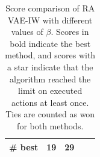 \begin{table}[ht]
\begin{center}
\begin{small}
\begin{tabular}{lrrrl}
\midrule

\# best &    19                   & 29                      \\

\bottomrule

\end{tabular}
\end{small}
\end{center}
\caption{Score comparison of RA VAE-IW with different values of $\beta$. Scores in bold indicate the best method, and scores with a star indicate that the algorithm reached the limit on executed actions at least once. Ties are counted as won for both methods.} 
\label{tab:atari-comparison}
\end{table}
